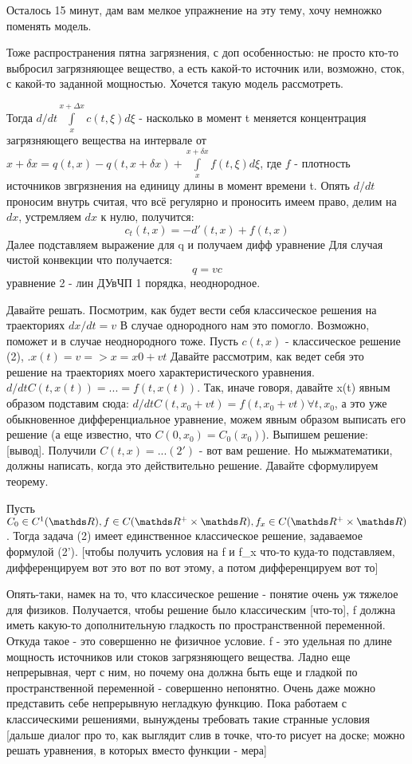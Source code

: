 Осталось 15 минут, дам вам мелкое упражнение на эту тему, хочу немножко поменять модель.

\begin{example}
Тоже распространения пятна загрязнения, с доп особенностью: не просто кто-то выбросил загрязняющее вещество, а есть какой-то источник или, возможно, сток, с какой-то заданной мощностью. Хочется такую модель рассмотреть.
\end{example}

Тогда $d/dt \int \limits_x^{x + \Delta x} c(t, \xi ) d \xi$ - насколько в момент t меняется концентрация загрязняющего вещества на интервале от $x + \delta x = q(t, x) - q(t, x + \delta x) + \int \limits_x^{x+\delta x} f(t,\xi) d\xi$, где $f$ - плотность источников звгрязнения на единицу длины в момент времени t.
Опять $d/dt$ проносим внутрь считая, что всё регулярно и проносить имеем право, делим на $dx$, устремляем $dx$ к нулю, получится:
$$c_t(t,x) = -d'(t,x) + f(t, x)$$
Далее подставляем выражение для q и получаем дифф уравнение
Для случая чистой конвекции что получается:
$$q = vc$$
уравнение 2 - лин ДУвЧП 1 порядка, неоднородное.

Давайте решать. Посмотрим, как будет вести себя классическое решения на траекториях $dx/dt = v$
В случае однородного нам это помогло. Возможно, поможет и в случае неоднородного тоже.
Пусть $c(t,x)$ - классическое решение (2), .$x(t) = v => x = x0 + vt$
Давайте рассмотрим, как ведет себя это решение на траекториях моего характеристического уравнения. $d/dt C(t, x(t)) = ... = f (t, x(t))$. Так, иначе говоря, давайте x(t) явным образом подставим сюда: $d/dt C(t, x_0 + vt) = f(t, x_0 + vt) \forall t, x_0$, а это уже обыкновенное дифференциальное уравнение, можем явным образом выписать его решение (а еще известно, что $C(0, x_0) = C_0(x_0)$). Выпишем решение: [вывод]. Получили $C(t, x) = ... (2')$ - вот вам решение. Но мыжматематики, должны написать, когда это действительно решение. Давайте сформулируем теорему.

\begin{theorem}
Пусть $C_0 \in C^1(\real), f \in C(\real^+ \times \real), f_x \in C(\real^+ \times \real)$. Тогда задача (2) имеет единственное классическое решение, задаваемое формулой (2'). [чтобы получить условия на f и f_x что-то куда-то подставляем, дифференцируем вот это вот по вот этому, а потом дифференцируем вот то]
\end{theorem}

Опять-таки, намек на то, что классическое решение - понятие очень уж тяжелое для физиков. Получается, чтобы решение было классическим [что-то], f должна иметь какую-то дополнительную гладкость по пространственной переменной. Откуда такое - это совершенно не физичное условие. f - это удельная по длине мощность источников или стоков загрязняющего вещества. Ладно еще непрерывная, черт с ним, но почему она должна быть еще и гладкой по пространственной переменной - совершенно непонятно. Очень даже можно представить себе непрерывную негладкую функцию. Пока работаем с классическими решениями, вынуждены требовать такие странные условия [дальше диалог про то, как выглядит слив в точке, что-то рисует на доске; можно решать уравнения, в которых вместо функции - мера]